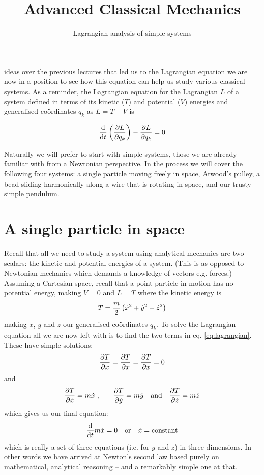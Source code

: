 \documentclass[english,seminar,headertitle]{lecture}
\title{Advanced Classical Mechanics}
\subtitle{Lagrangian analysis of simple systems}
\author{}
\date{}{}{}
\begin{document}
\noindent{} ideas over the previous lectures that led us to the Lagrangian equation we are now in a position to see how this equation can help us study various classical systems. As a reminder, the Lagrangian equation for the Lagrangian $L$ of a system defined in terms of its kinetic ($T$) and potential ($V$) energies and generalised co\"{o}rdinates $q_k$ as $L = T - V$ is

\begin{equation}
{\textrm{d} \over \textrm{d} t } \left( {\partial L \over \partial \dot{q}_k} \right) - {\partial L \over \partial q_k} = 0
\label{eq:lagrangian}
\end{equation}%

Naturally we will prefer to start with simple systems, those we are already familiar with from a Newtonian perspective. In the process we will cover the following four systems: a single particle moving freely in space, Atwood's pulley, a bead sliding harmonically along a wire that is rotating in space, and our trusty simple pendulum.

\section{A single particle in space}

Recall that all we need to study a system using analytical mechanics are two scalars: the kinetic and potential energies of a system. (This is as opposed to Newtonian mechanics which demands a knowledge of vectors e.g. forces.)  Assuming a Cartesian space, recall that a point particle in motion has no potential energy, making $V=0$ and $L=T$ where the kinetic energy is $$T = {m \over 2} \left( \dot{x}^2 + \dot{y}^2 + \dot{z}^2 \right)$$making $x$, $y$ and $z$ our generalised co\"{o}rdinates $q_k$. To solve the Lagrangian equation all we are now left with is to find the two terms in eq. \ref{eq:lagrangian}. These have simple solutions:
$${\partial T \over \partial x} = {\partial T \over \partial x} = {\partial T \over \partial x} = 0$$
and
$${\partial T \over \partial \dot{x}} = m\dot{x} \; \textrm{,} \qquad {\partial T \over \partial \dot{y}} = m\dot{y} \quad \textrm{and} \quad {\partial T \over \partial \dot{z}} = m\dot{z}$$
which gives us our final equation:
$$
	{\textrm{d} \over \textrm{d} t } m\dot{x} = 0 \quad \textrm{or} \quad \dot{x} = \textrm{constant}
$$
which is really a set of three equations (i.e. for $y$ and $z$) in three dimensions. In other words we have arrived at Newton's second law based purely on mathematical, analytical reasoning -- and a remarkably simple one at that.
\end{document}
